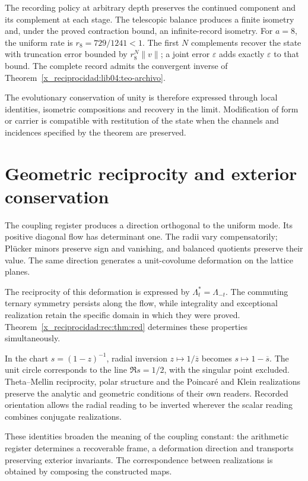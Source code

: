 The recording policy at arbitrary depth preserves the continued component and its complement at each stage. The telescopic balance produces a finite isometry and, under the proved contraction bound, an infinite-record isometry. For \(a=8\), the uniform rate is \(r_8=729/1241<1\). The first \(N\) complements recover the state with truncation error bounded by \(r_8^N\|v\|\); a joint error \(\varepsilon\) adds exactly \(\varepsilon\) to that bound. The complete record admits the convergent inverse of Theorem~\ref{x_reciprocidad:lib04:teo-archivo}.

The evolutionary conservation of unity is therefore expressed through local identities, isometric compositions and recovery in the limit. Modification of form or carrier is compatible with restitution of the state when the channels and incidences specified by the theorem are preserved.

\section{Geometric reciprocity and exterior conservation}

The coupling register produces a direction orthogonal to the uniform mode. Its positive diagonal flow has determinant one. The radii vary compensatorily; Plücker minors preserve sign and vanishing, and balanced quotients preserve their value. The same direction generates a unit-covolume deformation on the lattice planes.

The reciprocity of this deformation is expressed by \(\Lambda_t^*=\Lambda_{-t}\). The commuting ternary symmetry persists along the flow, while integrality and exceptional realization retain the specific domain in which they were proved. Theorem~\ref{x_reciprocidad:rec:thm:red} determines these properties simultaneously.

In the chart \(s=(1-z)^{-1}\), radial inversion \(z\mapsto1/\overline z\) becomes \(s\mapsto1-\overline s\). The unit circle corresponds to the line \(\Re s=1/2\), with the singular point excluded. Theta--Mellin reciprocity, polar structure and the Poincaré and Klein realizations preserve the analytic and geometric conditions of their own readers. Recorded orientation allows the radial reading to be inverted wherever the scalar reading combines conjugate realizations.

These identities broaden the meaning of the coupling constant: the arithmetic register determines a recoverable frame, a deformation direction and transports preserving exterior invariants. The correspondence between realizations is obtained by composing the constructed maps.

